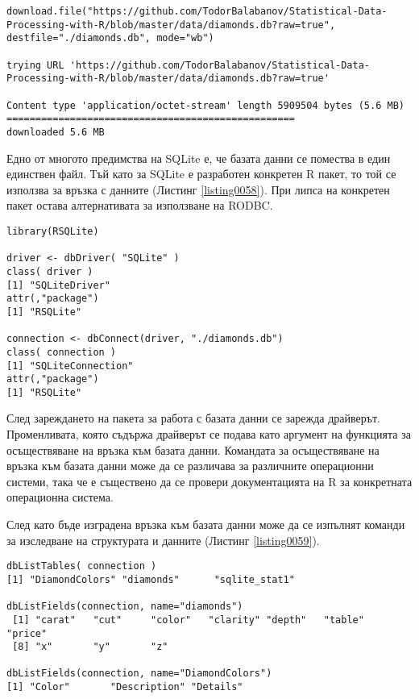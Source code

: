 \begin{lstlisting}[caption=Сваляне на файл с данни, label=listing0057]
download.file("https://github.com/TodorBalabanov/Statistical-Data-Processing-with-R/blob/master/data/diamonds.db?raw=true", destfile="./diamonds.db", mode="wb")

trying URL 'https://github.com/TodorBalabanov/Statistical-Data-Processing-with-R/blob/master/data/diamonds.db?raw=true'

Content type 'application/octet-stream' length 5909504 bytes (5.6 MB)
==================================================
downloaded 5.6 MB
\end{lstlisting}

Едно от многото предимства на SQLite е, че базата данни се помества в един единствен файл. Тъй като за SQLite е разработен конкретен R пакет, то той се използва за връзка с данните (Листинг \ref{listing0058}). При липса на конкретен пакет остава алтернативата за използване на RODBC.

\begin{lstlisting}[caption=Връзка към базата данни, label=listing0058]
library(RSQLite)

driver <- dbDriver( "SQLite" )
class( driver )
[1] "SQLiteDriver"
attr(,"package")
[1] "RSQLite"

connection <- dbConnect(driver, "./diamonds.db")
class( connection )
[1] "SQLiteConnection"
attr(,"package")
[1] "RSQLite"
\end{lstlisting}

След зареждането на пакета за работа с базата данни се зарежда драйверът. Променливата, която съдържа драйверът се подава като аргумент на функцията за осъществяване на връзка към базата данни. Командата за осъществяване на връзка към базата данни може да се различава за различните операционни системи, така че е съществено да се провери документацията на R за конкретната операционна система. 

След като бъде изградена връзка към базата данни може да се изпълнят команди за изследване на структурата и данните (Листинг \ref{listing0059}).

\begin{lstlisting}[caption=Изследване на базата данни, label=listing0059]
dbListTables( connection )
[1] "DiamondColors" "diamonds"      "sqlite_stat1" 

dbListFields(connection, name="diamonds")
 [1] "carat"   "cut"     "color"   "clarity" "depth"   "table"   "price"  
 [8] "x"       "y"       "z"

dbListFields(connection, name="DiamondColors")
[1] "Color"       "Description" "Details"
\end{lstlisting}

